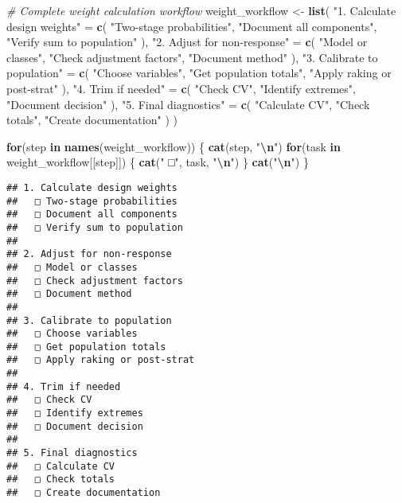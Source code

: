 \documentclass[
]{article}
\newenvironment{Shaded}{\begin{snugshade}}{\end{snugshade}}
\newcommand{\CommentTok}[1]{\textcolor[rgb]{0.56,0.35,0.01}{\textit{#1}}}
\newcommand{\ControlFlowTok}[1]{\textcolor[rgb]{0.13,0.29,0.53}{\textbf{#1}}}
\newcommand{\FunctionTok}[1]{\textcolor[rgb]{0.13,0.29,0.53}{\textbf{#1}}}
\newcommand{\NormalTok}[1]{#1}
\newcommand{\OtherTok}[1]{\textcolor[rgb]{0.56,0.35,0.01}{#1}}
\newcommand{\SpecialCharTok}[1]{\textcolor[rgb]{0.81,0.36,0.00}{\textbf{#1}}}
\newcommand{\StringTok}[1]{\textcolor[rgb]{0.31,0.60,0.02}{#1}}
\begin{document}
\begin{Shaded}
\begin{Highlighting}[]
\CommentTok{\# Complete weight calculation workflow}
\NormalTok{weight\_workflow }\OtherTok{\textless{}{-}} \FunctionTok{list}\NormalTok{(}
  \StringTok{"1. Calculate design weights"} \OtherTok{=} \FunctionTok{c}\NormalTok{(}
    \StringTok{"Two{-}stage probabilities"}\NormalTok{,}
    \StringTok{"Document all components"}\NormalTok{,}
    \StringTok{"Verify sum to population"}
\NormalTok{  ),}
  \StringTok{"2. Adjust for non{-}response"} \OtherTok{=} \FunctionTok{c}\NormalTok{(}
    \StringTok{"Model or classes"}\NormalTok{,}
    \StringTok{"Check adjustment factors"}\NormalTok{,}
    \StringTok{"Document method"}
\NormalTok{  ),}
  \StringTok{"3. Calibrate to population"} \OtherTok{=} \FunctionTok{c}\NormalTok{(}
    \StringTok{"Choose variables"}\NormalTok{,}
    \StringTok{"Get population totals"}\NormalTok{,}
    \StringTok{"Apply raking or post{-}strat"}
\NormalTok{  ),}
  \StringTok{"4. Trim if needed"} \OtherTok{=} \FunctionTok{c}\NormalTok{(}
    \StringTok{"Check CV"}\NormalTok{,}
    \StringTok{"Identify extremes"}\NormalTok{,}
    \StringTok{"Document decision"}
\NormalTok{  ),}
  \StringTok{"5. Final diagnostics"} \OtherTok{=} \FunctionTok{c}\NormalTok{(}
    \StringTok{"Calculate CV"}\NormalTok{,}
    \StringTok{"Check totals"}\NormalTok{,}
    \StringTok{"Create documentation"}
\NormalTok{  )}
\NormalTok{)}

\ControlFlowTok{for}\NormalTok{(step }\ControlFlowTok{in} \FunctionTok{names}\NormalTok{(weight\_workflow)) \{}
  \FunctionTok{cat}\NormalTok{(step, }\StringTok{"}\SpecialCharTok{\textbackslash{}n}\StringTok{"}\NormalTok{)}
  \ControlFlowTok{for}\NormalTok{(task }\ControlFlowTok{in}\NormalTok{ weight\_workflow[[step]]) \{}
    \FunctionTok{cat}\NormalTok{(}\StringTok{"  □"}\NormalTok{, task, }\StringTok{"}\SpecialCharTok{\textbackslash{}n}\StringTok{"}\NormalTok{)}
\NormalTok{  \}}
  \FunctionTok{cat}\NormalTok{(}\StringTok{"}\SpecialCharTok{\textbackslash{}n}\StringTok{"}\NormalTok{)}
\NormalTok{\}}
\end{Highlighting}
\end{Shaded}

\begin{verbatim}
## 1. Calculate design weights 
##   □ Two-stage probabilities 
##   □ Document all components 
##   □ Verify sum to population 
## 
## 2. Adjust for non-response 
##   □ Model or classes 
##   □ Check adjustment factors 
##   □ Document method 
## 
## 3. Calibrate to population 
##   □ Choose variables 
##   □ Get population totals 
##   □ Apply raking or post-strat 
## 
## 4. Trim if needed 
##   □ Check CV 
##   □ Identify extremes 
##   □ Document decision 
## 
## 5. Final diagnostics 
##   □ Calculate CV 
##   □ Check totals 
##   □ Create documentation
\end{verbatim}
\end{document}

